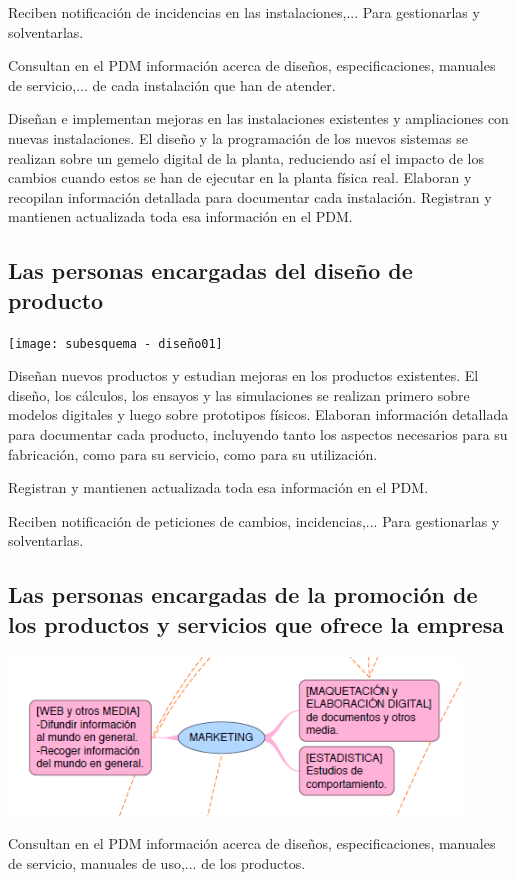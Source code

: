 \documentclass[spanish,12pt,a4paper,final,oneside]{book}
\begin{document}
Reciben notificación de incidencias en las instalaciones,... Para gestionarlas y solventarlas.

Consultan en el PDM información acerca de diseños, especificaciones, manuales de servicio,... de cada instalación que han de atender.

Diseñan e implementan mejoras en las instalaciones existentes y ampliaciones con nuevas instalaciones. El diseño y la programación de los nuevos sistemas se realizan sobre un gemelo digital de la planta, reduciendo así el impacto de los cambios cuando estos se han de ejecutar en la planta física real.  Elaboran y recopilan información detallada para documentar cada instalación. Registran y mantienen actualizada toda esa información en el PDM.

\subsection{Las personas encargadas del diseño de producto}
\texttt{[image: subesquema - diseño01]}

Diseñan nuevos productos y estudian mejoras en los productos existentes. El diseño, los cálculos, los ensayos y las simulaciones se realizan primero sobre modelos digitales y luego sobre prototipos físicos.  Elaboran información detallada para documentar cada producto, incluyendo tanto los aspectos necesarios para su fabricación, como para su servicio, como para su utilización. 

Registran y mantienen actualizada toda esa información en el PDM.

Reciben notificación de peticiones de cambios, incidencias,... Para gestionarlas y solventarlas.

\subsection{Las personas encargadas de la promoción de los productos y servicios que ofrece la empresa}
\includegraphics[width=0.9\textwidth]{subesquema - marketing01}

Consultan en el PDM información acerca de diseños, especificaciones, manuales de servicio, manuales de uso,... de los productos.
\end{document}
